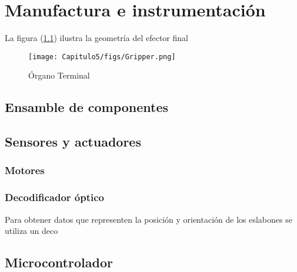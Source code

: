 


\chapter{\textcolor{Azul}{Manufactura e instrumentación}}

La figura (\ref{gripper01})                     %
ilustra la geometría del efector final

\begin{figure}
	\centering
	\texttt{[image: Capitulo5/figs/Gripper.png]}      %
	\caption{Órgano Terminal}            %
	\label{gripper01}                            %
\end{figure}


\section{Ensamble de componentes}

\section{Sensores y actuadores}

\subsection{Motores}

\subsection{Decodificador óptico}

Para obtener datos que representen la posición y orientación de los eslabones se utiliza un deco

\section{Microcontrolador}